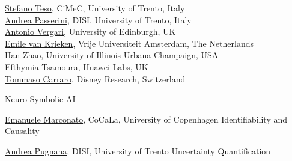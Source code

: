 \documentclass[11pt, a4paper]{awesome-cv}
\begin{document}
\begin{cventries}

\cventry
    {%
     \begin{minipage}[t]{\linewidth}
     \href{https://stefanoteso.github.io/}{Stefano Teso}, CiMeC, University of Trento, Italy\\
     \href{https://disi.unitn.it/~passerini/}{Andrea Passerini}, DISI, University of Trento, Italy\\
     \href{http://nolovedeeplearning.com/}{Antonio Vergari}, University of Edinburgh, UK\\
     \href{https://www.emilevankrieken.com/}{Emile van Krieken}, Vrije Universiteit Amsterdam, The Netherlands \\
     \href{https://hanzhaoml.github.io/}{Han Zhao}, University of Illinois Urbana-Champaign, USA \\
     \href{https://tsamoura.github.io/}{Efthymia Tsamoura}, Huawei Labs, UK \\
     \href{https://www.linkedin.com/in/tommaso-carraro/}{Tommaso Carraro}, Disney Research, Switzerland
     \end{minipage}%
    }
    {Neuro-Symbolic AI}
    {}
    {}
    {}


  \cventry
    {
        \href{https://scholar.google.com/citations?hl=it&user=H0gXWAgAAAAJ&view_op=list_works&sortby=pubdate}{Emanuele Marconato}, CoCaLa,  University of Copenhagen
    }
    {
        Identifiability and Causality
    }
    {}
    {}
    {}

  \cventry
    {
        \href{https://andrepugni.github.io/}{Andrea Pugnana}, DISI, University of Trento}
    {
        Uncertainty Quantification
    }
    {}
    {}
    {}
\end{cventries}
%
\end{document}
